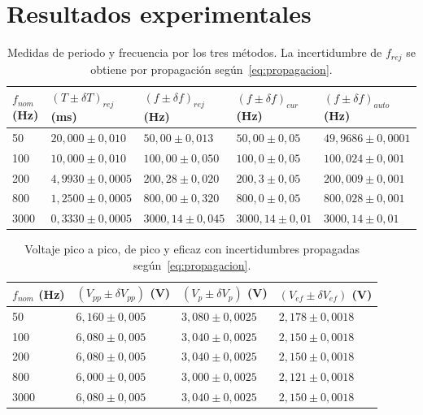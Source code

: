 \documentclass[12pt,a4paper]{article}
\begin{document}
\section{Resultados experimentales}

\begin{table}[H]
\centering
\small
\setlength{\tabcolsep}{3.5pt}
\caption{Medidas de periodo y frecuencia por los tres métodos. La incertidumbre de $f_{rej}$ se obtiene por propagación según~\eqref{eq:propagacion}.}
\label{tab:tiempos}
\begin{tabular}{C{1.3cm}C{3.2cm}C{3.0cm}C{3.0cm}C{3.2cm}}
\toprule
$f_{nom}$ (Hz) & $(T \pm \delta T)_{rej}$ (ms) & $(f \pm \delta f)_{rej}$ (Hz) & $(f \pm \delta f)_{cur}$ (Hz) & $(f \pm \delta f)_{auto}$ (Hz) \\
   & $20{,}000 \pm 0{,}010$  & $50{,}00 \pm 0{,}013$   & $50{,}00 \pm 0{,}05$   & $49{,}9686 \pm 0{,}0001$ \\
100  & $10{,}000 \pm 0{,}010$  & $100{,}00 \pm 0{,}050$  & $100{,}0 \pm 0{,}05$   & $100{,}024 \pm 0{,}001$  \\
200  & $4{,}9930 \pm 0{,}0005$ & $200{,}28 \pm 0{,}020$  & $200{,}3 \pm 0{,}05$   & $200{,}009 \pm 0{,}001$  \\
800  & $1{,}2500 \pm 0{,}0005$ & $800{,}00 \pm 0{,}320$  & $800{,}0 \pm 0{,}05$   & $800{,}028 \pm 0{,}001$  \\
3000 & $0{,}3330 \pm 0{,}0005$ & $3000{,}14 \pm 0{,}045$ & $3000{,}14 \pm 0{,}01$ & $3000{,}14 \pm 0{,}01$   \\
\bottomrule
\end{tabular}
\end{table}

\begin{table}[H]
\centering
\small
\setlength{\tabcolsep}{5pt}
\caption{Voltaje pico a pico, de pico y eficaz con incertidumbres propagadas según~\eqref{eq:propagacion}.}
\label{tab:voltajes}
\begin{tabular}{C{1.3cm}C{3.0cm}C{3.0cm}C{3.0cm}}
\toprule
$f_{nom}$ (Hz) & $(V_{pp} \pm \delta V_{pp})$ (V) & $(V_p \pm \delta V_p)$ (V) & $(V_{ef} \pm \delta V_{ef})$ (V) \\
   & $6{,}160 \pm 0{,}005$ & $3{,}080 \pm 0{,}0025$ & $2{,}178 \pm 0{,}0018$ \\
100  & $6{,}080 \pm 0{,}005$ & $3{,}040 \pm 0{,}0025$ & $2{,}150 \pm 0{,}0018$ \\
200  & $6{,}080 \pm 0{,}005$ & $3{,}040 \pm 0{,}0025$ & $2{,}150 \pm 0{,}0018$ \\
800  & $6{,}000 \pm 0{,}005$ & $3{,}000 \pm 0{,}0025$ & $2{,}121 \pm 0{,}0018$ \\
3000 & $6{,}080 \pm 0{,}005$ & $3{,}040 \pm 0{,}0025$ & $2{,}150 \pm 0{,}0018$ \\
\bottomrule
\end{tabular}
\end{table}
\end{document}
